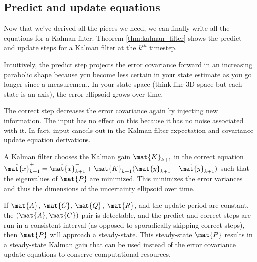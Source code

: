\subsection{Predict and update equations}

Now that we've derived all the pieces we need, we can finally write all the
equations for a Kalman filter. Theorem \ref{thm:kalman_filter} shows the predict
and update steps for a Kalman filter at the $k^{th}$ timestep.

Intuitively, the predict step projects the error covariance forward in an
increasing parabolic shape because you become less certain in your state
estimate as you go longer since a measurement. In your state-space (think like
3D space but each state is an axis), the error ellipsoid grows over time.

The correct step decreases the error covariance again by injecting new
information. The input has no effect on this because it has no noise associated
with it. In fact, input cancels out in the Kalman filter expectation and
covariance update equation derivations.

A Kalman filter chooses the Kalman gain $\mat{K}_{k+1}$ in the correct equation
$\hat{\mat{x}}_{k+1}^+ = \hat{\mat{x}}_{k+1}^- + \mat{K}_{k+1}(\mat{y}_{k+1} -
\hat{\mat{y}}_{k+1})$ such that the eigenvalues of $\mat{P}$ are minimized. This
minimizes the error variances and thus the dimensions of the uncertainty
ellipsoid over time.

If $\mat{A}$, $\mat{C}$, $\mat{Q}$, $\mat{R}$, and the update period are
constant, the $(\mat{A}, \mat{C})$ pair is detectable, and the predict and
correct steps are run in a consistent interval (as opposed to sporadically
skipping correct steps), then $\mat{P}$ will approach a steady-state. This
steady-state $\mat{P}$ results in a steady-state Kalman gain that can be used
instead of the error covariance update equations to conserve computational
resources.

